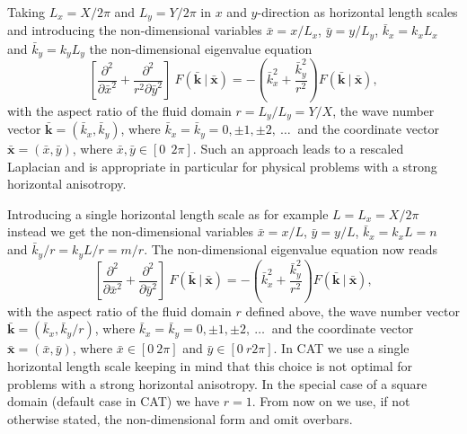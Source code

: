 Taking $L_{x} = X/2 \pi$ and $L_{y} = Y/ 2 \pi$ in $x$ and $y$-direction 
as horizontal length scales and introducing the non-dimensional variables
$\bar{x} = x/L_{x}$, $\bar{y} = y/L_{y}$, $\bar{k}_{x} = k_{x} L_{x}$ 
and $\bar{k}_{y} = k_{y} L_{y}$ the non-dimensional eigenvalue equation
\begin{equation} \label{eq_ndeigFkxkyLxLy}
 \left[ 
  \frac{\partial^{2}}{\partial \bar{x}^{2}} 
   +
  \frac{\partial^{2}}{r^{2} \partial \bar{y}^{2}} 
 \right] \ 
  F(\mathbf{\bar{k}} \ | \ \mathbf{\bar{x}})
   = 
  - \left( \bar{k}_{x}^{2} + \frac{\bar{k}_{y}^{2}}{r^{2}} \right)
  F(\mathbf{\bar{k}} \ | \ \mathbf{\bar{x}}),
\end{equation}
with the aspect ratio of the fluid domain $r = L_{y}/L_{y} = Y/X$,
the wave number vector $\mathbf{\bar{k}} = (\bar{k}_{x},\bar{k}_{y})$, 
where $\bar{k}_{x} = \bar{k}_{y} = 0, \pm 1, \pm 2, \ \dots \ $ and the
coordinate vector $\mathbf{\bar{x}} = (\bar{x},\bar{y})$, where 
$\bar{x},\bar{y} \in [0 \ \ 2\pi]$.
Such an approach leads to a rescaled Laplacian and is appropriate 
in particular for physical problems with a strong horizontal 
anisotropy.

Introducing a single horizontal length scale as for example 
$L = L_{x} = X/2 \pi$ instead we get the non-dimensional variables 
$\bar{x} = x/L$, $\bar{y} = y/L$, $\bar{k}_{x} = k_{x} L = n$ and 
$\bar{k}_{y}/r = k_{y} L/r = m/r$. The non-dimensional eigenvalue 
equation now reads
\begin{equation} \label{eq_ndeigFkxkyL}
 \left[ 
  \frac{\partial^{2}}{\partial \bar{x}^{2}} 
   +
  \frac{\partial^{2}}{\partial \bar{y}^{2}} 
 \right] \ 
  F(\mathbf{\bar{k}} \ | \ \mathbf{\bar{x}})
   = 
  - \left( \bar{k}_{x}^{2} + \frac{\bar{k}_{y}^{2}}{r^{2}} \right)
  F(\mathbf{\bar{k}} \ | \ \mathbf{\bar{x}}),
\end{equation}
with the aspect ratio of the fluid domain $r$ defined above, 
the wave number vector $\mathbf{\bar{k}} = (\bar{k}_{x},\bar{k}_{y}/r)$, 
where $\bar{k}_{x} = \bar{k}_{y} = 0, \pm 1, \pm 2, \ \dots \ $ and
the coordinate vector $\mathbf{\bar{x}} = (\bar{x},\bar{y})$, where
$\bar{x} \in [0 \ 2 \pi]$ and $\bar{y} \in [0 \ r 2 \pi]$. 
In CAT we use a single horizontal length scale 
keeping in mind that this choice is not optimal for problems 
with a strong horizontal anisotropy. In the special case of a square domain 
(default case in CAT) we have $r = 1$.
From now on we use, if not otherwise stated, the non-dimensional form and 
omit overbars. 

